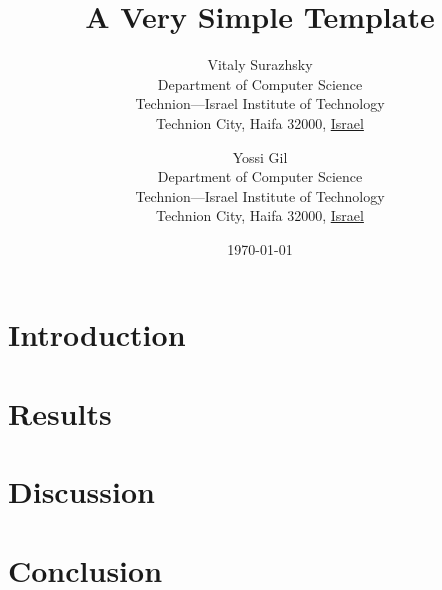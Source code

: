 \documentclass[12pt, a4paper, titlepage]{article}
\title{A Very Simple Template}
\author{
  Vitaly Surazhsky \\
          Department of Computer Science\\
  Technion---Israel Institute of Technology\\
  Technion City, Haifa 32000, \underline{Israel}
      \and
  Yossi Gil\\
  Department of Computer Science\\
  Technion---Israel Institute of Technology\\
  Technion City, Haifa 32000, \underline{Israel}
}
\date{\today}
\begin{document}
\maketitle

\begin{abstract}

\end{abstract}

\section{Introduction}\label{introduction}


\section{Results}\label{results}


\section{Discussion}\label{discussion}


\section{Conclusion}\label{conclusion}




\end{document}
